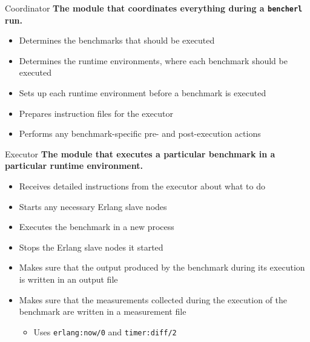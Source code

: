 \documentclass{beamer}
\begin{document}
\begin{frame}[t]{Coordinator}
	{\bf The module that coordinates everything during a \texttt{bencherl} run.}
	\begin{itemize}
		\item Determines the \textcolor{burgundy}{benchmarks} that should be executed
		\item Determines the \textcolor{burgundy}{runtime environments}, where each benchmark should be executed
		\item \textcolor{burgundy}{Sets up} each runtime environment before a benchmark is executed
		\item Prepares instruction files for the \textcolor{burgundy}{executor}
		\item Performs any benchmark-specific \textcolor{burgundy}{pre-} and \textcolor{burgundy}{post-execution actions}
	\end{itemize}
\end{frame}

\begin{frame}[t]{Executor}
	{\bf The module that executes a particular benchmark in a particular runtime environment.}
	\begin{itemize}
		\item Receives detailed instructions from the \textcolor{burgundy}{executor} about what to do 
		\item \textcolor{burgundy}{Starts} any necessary Erlang slave nodes
		\item \textcolor{burgundy}{Executes} the benchmark in a new process
		\item \textcolor{burgundy}{Stops} the Erlang slave nodes it started
		\item Makes sure that the \textcolor{burgundy}{output} produced by the benchmark during its execution is written in an output file
		\item Makes sure that the \textcolor{burgundy}{measurements} collected during the execution of the benchmark are written in a measurement file 
			\begin{itemize}
				\item Uses \texttt{erlang:now/0} and \texttt{timer:diff/2}
			\end{itemize}
	\end{itemize}
\end{frame}
\end{document}
